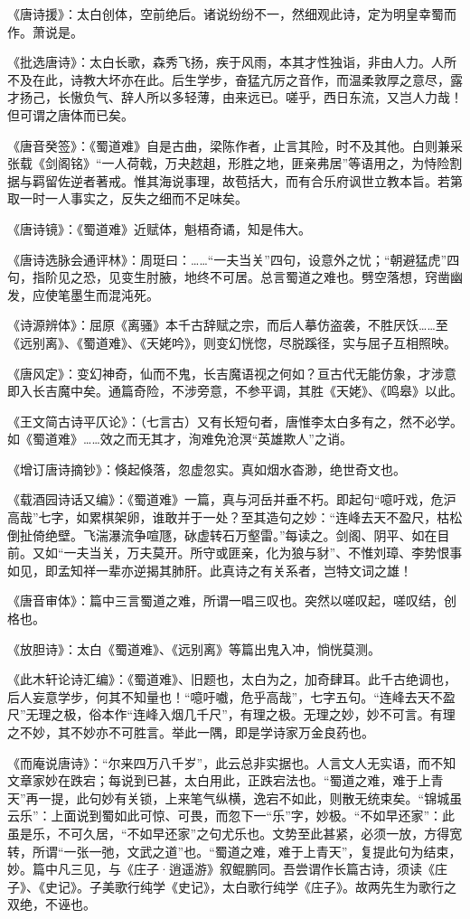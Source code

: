 \documentclass[letterpaper,12pt,english]{sphinxmanual}
\begin{document}
《唐诗援》：太白创体，空前绝后。诸说纷纷不一，然细观此诗，定为明皇幸蜀而作。萧说是。

《批选唐诗》：太白长歌，森秀飞扬，疾于风雨，本其才性独诣，非由人力。人所不及在此，诗教大坏亦在此。后生学步，奋猛亢厉之音作，而温柔敦厚之意尽，露才扬己，长慠负气、辞人所以多轻薄，由来远已。嗟乎，西日东流，又岂人力哉！但可谓之唐体而已矣。

《唐音癸签》：《蜀道难》自是古曲，梁陈作者，止言其险，时不及其他。白则兼采张载《剑阁铭》“一人荷戟，万夬趑趄，形胜之地，匪亲弗居”等语用之，为恃险割据与羁留佐逆者著戒。惟其海说事理，故苞括大，而有合乐府讽世立教本旨。若第取一时一人事实之，反失之细而不足味矣。

《唐诗镜》：《蜀道难》近赋体，魁梧奇谲，知是伟大。

《唐诗选脉会通评林》：周珽曰：……“一夫当关”四句，设意外之忧；“朝避猛虎”四句，指阶见之恐，见变生肘腋，地终不可居。总言蜀道之难也。劈空落想，窍凿幽发，应使笔墨生而混沌死。

《诗源辨体》：屈原《离骚》本千古辞赋之宗，而后人摹仿盗袭，不胜厌饫……至《远别离》、《蜀道难》、《天姥吟》，则变幻恍惚，尽脱蹊径，实与屈子互相照映。

《唐风定》：变幻神奇，仙而不鬼，长吉魔语视之何如？亘古代无能仿象，才涉意即入长吉魔中矣。通篇奇险，不涉旁意，不参平调，其胜《天姥》、《鸣皋》以此。

《王文简古诗平仄论》：（七言古）又有长短句者，唐惟李太白多有之，然不必学。如《蜀道难》……效之而无其才，洵难免沧溟“英雄欺人”之诮。

《增订唐诗摘钞》：倏起倏落，忽虚忽实。真如烟水杳渺，绝世奇文也。

《载酒园诗话又编》：《蜀道难》一篇，真与河岳并垂不朽。即起句“噫吁戏，危沪高哉”七字，如累棋架卵，谁敢并于一处？至其造句之妙：“连峰去天不盈尺，枯松倒扯倚绝壁。飞湍瀑流争喧豗，砅虚转石万壑雷。”每读之。剑阁、阴平、如在目前。又如“一夫当关，万夫莫开。所守或匪亲，化为狼与豺”、不惟刘璋、李势恨事如见，即孟知祥一辈亦逆揭其肺肝。此真诗之有关系者，岂特文词之雄！

《唐音审体》：篇中三言蜀道之难，所谓一唱三叹也。突然以嗟叹起，嗟叹结，创格也。

《放胆诗》：太白《蜀道难》、《远别离》等篇出鬼入冲，惝恍莫测。

《此木轩论诗汇编》：《蜀道难》、旧题也，太白为之，加奇肆耳。此千古绝调也，后人妄意学步，何其不知量也！“噫吁嚱，危乎高哉”，七字五句。“连峰去天不盈尺”无理之极，俗本作“连峰入烟几千尺”，有理之极。无理之妙，妙不可言。有理之不妙，其不妙亦不可胜言。举此一隅，即是学诗家万金良药也。

《而庵说唐诗》：“尔来四万八千岁”，此云总非实据也。人言文人无实语，而不知文章家妙在跌宕；每说到已甚，太白用此，正跌宕法也。“蜀道之难，难于上青天”再一提，此句妙有关锁，上来笔气纵横，逸宕不如此，则散无统束矣。“锦城虽云乐”：上面说到蜀如此可惊、可畏，而忽下一“乐”字，妙极。“不如早还家”：此虽是乐，不可久居，“不如早还家”之句尤乐也。文势至此甚紧，必须一放，方得宽转，所谓“一张一弛，文武之道”也。“蜀道之难，难于上青天”，复提此句为结束，妙。篇中凡三见，与《庄子·逍遥游》叙鲲鹏同。吾尝谓作长篇古诗，须读《庄子》、《史记》。子美歌行纯学《史记》，太白歌行纯学《庄子》。故两先生为歌行之双绝，不诬也。
\end{document}

